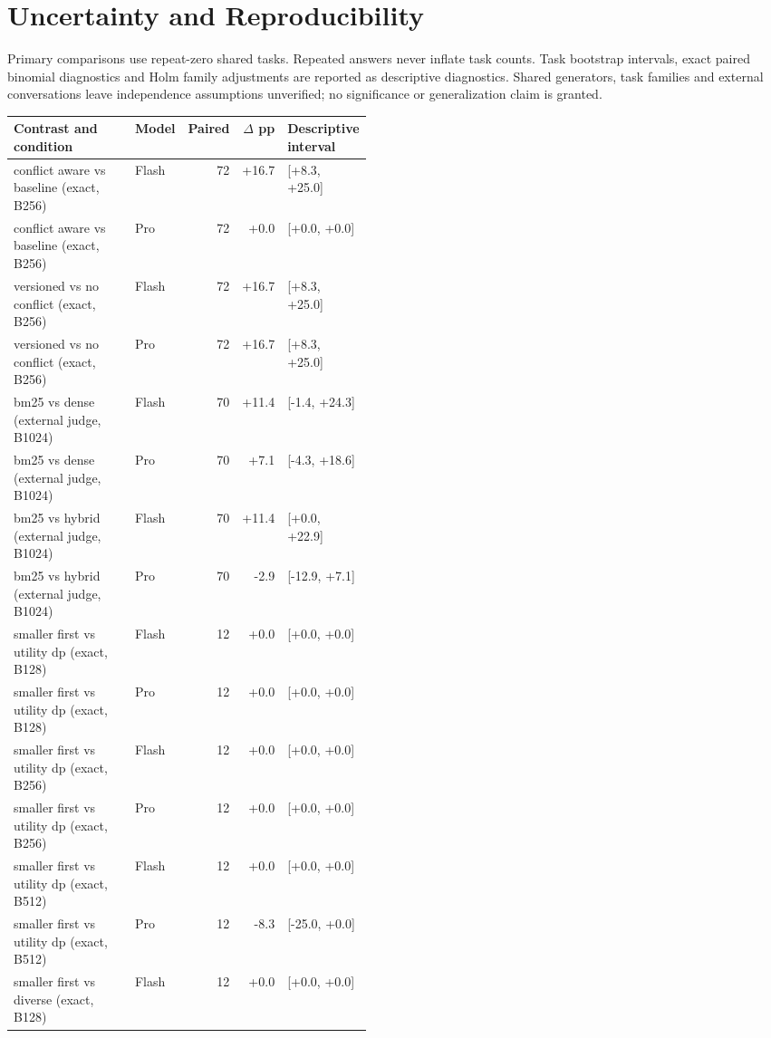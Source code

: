 \documentclass{article}
\begin{document}
\section{Uncertainty and Reproducibility}
Primary comparisons use repeat-zero shared tasks. Repeated answers never inflate task counts. Task bootstrap intervals, exact paired binomial diagnostics and Holm family adjustments are reported as descriptive diagnostics. Shared generators, task families and external conversations leave independence assumptions unverified; no significance or generalization claim is granted.
\begin{table}[ht]\centering\footnotesize\begin{tabular}{p{0.46\linewidth}lrrl}\toprule
Contrast and condition & Model & Paired & $\Delta$ pp & Descriptive interval \\ \midrule
conflict aware vs baseline (exact, B256) & Flash & 72 & +16.7 & [+8.3, +25.0] \\
conflict aware vs baseline (exact, B256) & Pro & 72 & +0.0 & [+0.0, +0.0] \\
versioned vs no conflict (exact, B256) & Flash & 72 & +16.7 & [+8.3, +25.0] \\
versioned vs no conflict (exact, B256) & Pro & 72 & +16.7 & [+8.3, +25.0] \\
bm25 vs dense (external judge, B1024) & Flash & 70 & +11.4 & [-1.4, +24.3] \\
bm25 vs dense (external judge, B1024) & Pro & 70 & +7.1 & [-4.3, +18.6] \\
bm25 vs hybrid (external judge, B1024) & Flash & 70 & +11.4 & [+0.0, +22.9] \\
bm25 vs hybrid (external judge, B1024) & Pro & 70 & -2.9 & [-12.9, +7.1] \\
smaller first vs utility dp (exact, B128) & Flash & 12 & +0.0 & [+0.0, +0.0] \\
smaller first vs utility dp (exact, B128) & Pro & 12 & +0.0 & [+0.0, +0.0] \\
smaller first vs utility dp (exact, B256) & Flash & 12 & +0.0 & [+0.0, +0.0] \\
smaller first vs utility dp (exact, B256) & Pro & 12 & +0.0 & [+0.0, +0.0] \\
smaller first vs utility dp (exact, B512) & Flash & 12 & +0.0 & [+0.0, +0.0] \\
smaller first vs utility dp (exact, B512) & Pro & 12 & -8.3 & [-25.0, +0.0] \\
smaller first vs diverse (exact, B128) & Flash & 12 & +0.0 & [+0.0, +0.0] \\

\end{tabular}
\end{table}
\end{document}
